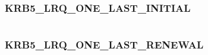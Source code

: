 \documentclass[letterpaper,10pt,english]{sphinxmanual}
\begin{document}
\begin{fulllineitems}
\label{appdev/refs/macros/KRB5_LRQ_ONE_ACCT_EXPTIME:KRB5_LRQ_ONE_ACCT_EXPTIME}
\end{fulllineitems}


\begin{tabulary}{\linewidth}{|L|L|}
\hline

 & 
\\\hline
\end{tabulary}



\subsubsection{KRB5\_LRQ\_ONE\_LAST\_INITIAL}
\label{appdev/refs/macros/KRB5_LRQ_ONE_LAST_INITIAL:krb5-lrq-one-last-initial-data}\label{appdev/refs/macros/KRB5_LRQ_ONE_LAST_INITIAL::doc}\label{appdev/refs/macros/KRB5_LRQ_ONE_LAST_INITIAL:krb5-lrq-one-last-initial}

\begin{fulllineitems}
\label{appdev/refs/macros/KRB5_LRQ_ONE_LAST_INITIAL:KRB5_LRQ_ONE_LAST_INITIAL}
\end{fulllineitems}


\begin{tabulary}{\linewidth}{|L|L|}
\hline

 & 
\\\hline
\end{tabulary}



\subsubsection{KRB5\_LRQ\_ONE\_LAST\_RENEWAL}
\label{appdev/refs/macros/KRB5_LRQ_ONE_LAST_RENEWAL:krb5-lrq-one-last-renewal-data}\label{appdev/refs/macros/KRB5_LRQ_ONE_LAST_RENEWAL::doc}\label{appdev/refs/macros/KRB5_LRQ_ONE_LAST_RENEWAL:krb5-lrq-one-last-renewal}

\begin{fulllineitems}
\label{appdev/refs/macros/KRB5_LRQ_ONE_LAST_RENEWAL:KRB5_LRQ_ONE_LAST_RENEWAL}
\end{fulllineitems}
\end{document}
